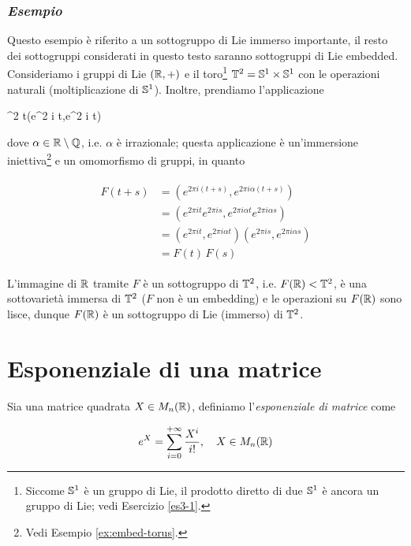 \subsubsection{\textit{Esempio}}

Questo esempio è riferito a un sottogruppo di Lie immerso importante, il resto dei sottogruppi considerati in questo testo saranno sottogruppi di Lie embedded.\\
Consideriamo i gruppi di Lie $ (\R,+) $ e il toro\footnote{%
	Siccome $ \S^{1} $ è un gruppo di Lie, il prodotto diretto di due $ \S^{1} $ è ancora un gruppo di Lie; vedi Esercizio \ref{es3-1}.%
} $ \T^{2} = \S^{1} \times \S^{1} $ con le operazioni naturali (moltiplicazione di $ \S^{1} $). Inoltre, prendiamo l'applicazione

	{\R}{\T^{2}}
	{t}{(e^{2 \pi i t},e^{2 \pi i \alpha t})}

dove $ \alpha \in \R \setminus \Q $, i.e. $ \alpha $ è irrazionale; questa applicazione è un'immersione iniettiva\footnote{%
	Vedi Esempio \ref{ex:embed-torus}.%
} e un omomorfismo di gruppi, in quanto

\begin{align}
	\begin{split}
		F(t+s) &= (e^{2 \pi i (t+s)},e^{2 \pi i \alpha (t+s)}) \\
		&= (e^{2 \pi i t} e^{2 \pi i s},e^{2 \pi i \alpha t} e^{2 \pi i \alpha s}) \\
		&= (e^{2 \pi i t},e^{2 \pi i \alpha t}) (e^{2 \pi i s},e^{2 \pi i \alpha s}) \\
		&= F(t) \, F(s)
	\end{split}
\end{align}

L'immagine di $ \R $ tramite $ F $ è un sottogruppo di $ \T^{2} $, i.e. $ F(\R) < \T^{2} $, è una sottovarietà immersa di $ \T^{2} $ ($ F $ non è un embedding) e le operazioni su $ F(\R) $ sono lisce, dunque $ F(\R) $ è un sottogruppo di Lie (immerso) di $ \T^{2} $.

\section{Esponenziale di una matrice}

Sia una matrice quadrata $ X \in M_{n}(\R) $, definiamo l'\textit{esponenziale di matrice} come

\begin{equation}
	e^{X} = \sum_{i=0}^{+\infty} \dfrac{X^{i}}{i!} \qcomma X \in M_{n}(\R)
\end{equation}

